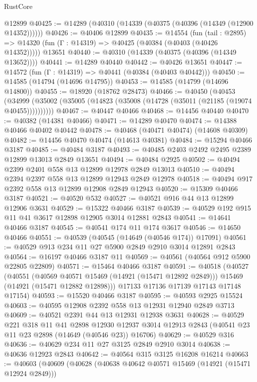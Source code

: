 \begin{lexlean}{RustCore}
\begin{coremodule}
    @12899
@40425 := @14289 (@40310 (@14339 (@40375 (@40396 (@14349 (@12900 @14352))))))
@40426 := @40406 @12899
@40435 := @14554
    (fun (tail : @2895) => @14320 (fun (Γ : @14319) => @40425 (@40384 (@40403 (@40426 @14352)))))
    @13651
@40440 := @40310 (@14339 (@40375 (@40396 (@14349 @13652))))
@40441 := @14289 @40440
@40442 := @40426 @13651
@40447 := @14572 (fun (Γ : @14319) => @40441 (@40384 (@40403 @40442)))
@40450 := @14585 (@14794 (@14696 @14795))
@40453 := @14585 (@14799 (@14696 @14800))
@40455 := @18920 (@18762 @28473)
@40466 := @40450
    (@40453 (@34999 (@35002 (@35005 (@14823 (@35008 (@14728 (@35011 (@21185 (@19074 @40455))))))))))
@40467 := @40447 @40466
@40468 := @14456 @40440
@40470 := @40382 (@14381 @40466)
@40471 := @14289 @40470
@40474 := @14388 @40466 @40402 @40442
@40478 := @40468 (@40471 @40474) (@14608 @40309)
@40482 := @14456 @40470 @40474 (@14613 @40381)
@40484 := @15294 @40466 @3187
@40485 := @40484 @3187
@40493 := @40485 @2403 @2492 @2495 @2389 @12899 @13013 @2849 @13651
@40494 := @40484 @2925
@40502 := @40494 @2399 @2401 @558 @13 @12899 @12978 @2849 @13013
@40510 := @40494 @2394 @2397 @558 @13 @12899 @12943 @2849 @12978
@40518 := @40494 @917 @2392 @558 @13 @12899 @12908 @2849 @12943
@40520 := @15309 @40466 @3187
@40521 := @40520 @532
@40527 := @40521 @916 @44 @13 @12899 @12906 @3631
@40529 := @15322 @40466 @3187
@40539 := @40529 @192 @915 @11 @41 @3617 @12898 @12905 @3014 @12881 @2843
@40541 := @14641 @40466 @3187
@40545 := @40541 @174 @11 @174 @3617
@40546 := @14650 @40466
@40551 := @40539 (@40545 (@14649 (@40546 @174)) @17091)
@40561 := @40529 @913 @234 @11 @27 @5900 @2849 @2910 @3014 @12891 @2843
@40564 := @16197 @40466 @3187 @11
@40569 := @40561 (@40564 @912 @5900 @22805 @22809)
@40571 := @15464 @40466 @3187
@40591 := @40518
    (@40527
      (@40551
        (@40569 @40571 @15469 (@14921 (@15471 @12892 @2849)))
        @15469
        (@14921 (@15471 @12882 @12898)))
      @17133
      @17136
      @17139
      @17143
      @17148
      @17154)
@40593 := @15520 @40466 @3187
@40595 := @40593 @2925 @15524
@40603 := @40595 @12908 @2392 @558 @13 @12931 @12940 @2849 @3713
@40609 := @40521 @2391 @44 @13 @12931 @12938 @3631
@40628 := @40529
    @221
    @318
    @11
    @41
    @2898
    @12930
    @12937
    @3014
    @12913
    @2843
    (@40541 @23 @11 @23 @2898 (@14649 (@40546 @23)) @16706)
@40629 := @40529 @316
@40636 := @40629 @234 @11 @27 @3125 @2849 @2910 @3014
@40638 := @40636 @12923 @2843
@40642 := @40564 @315 @3125 @16208 @16214
@40663 := @40603
    (@40609
      (@40628
        (@40638 @40642 @40571 @15469 (@14921 (@15471 @12924 @2849)))

\end{coremodule}
\end{lexlean}
